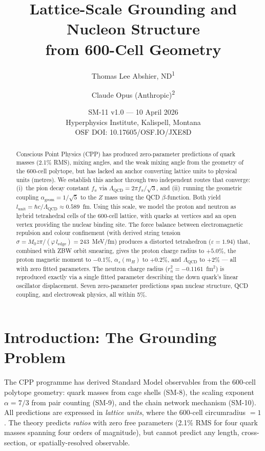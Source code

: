 \documentclass[12pt,a4paper]{article}
\title{Lattice-Scale Grounding and Nucleon Structure\\from 600-Cell Geometry}
\author{Thomas Lee Abshier, ND\textsuperscript{1} \and Claude Opus (Anthropic)\textsuperscript{2}}
\date{SM-11 v1.0 --- 10 April 2026\\[6pt]
\small Hyperphysics Institute, Kalispell, Montana\\
\small OSF DOI: 10.17605/OSF.IO/JXE8D}
\begin{document}
\maketitle

\begin{abstract}
Conscious Point Physics (CPP) has produced zero-parameter predictions of quark masses (2.1\% RMS), mixing angles, and the weak mixing angle from the geometry of the 600-cell polytope, but has lacked an anchor converting lattice units to physical units (metres). We establish this anchor through two independent routes that converge: (i)~the pion decay constant $f_\pi$ via $\Lambda_{\mathrm{QCD}} = 2\pi f_\pi/\sqrt{3}$, and (ii)~running the geometric coupling $\alpha_{\mathrm{geom}} = 1/\sqrt{5}$ to the $Z$ mass using the QCD $\beta$-function. Both yield $l_{\mathrm{unit}} = \hbar c/\Lambda_{\mathrm{QCD}} \approx 0.589$~fm. Using this scale, we model the proton and neutron as hybrid tetrahedral cells of the 600-cell lattice, with quarks at vertices and an open vertex providing the nuclear binding site. The force balance between electromagnetic repulsion and colour confinement (with derived string tension $\sigma = M_0 z\pi/(\varphi\, l_{\mathrm{edge}}) = 243$~MeV/fm) produces a distorted tetrahedron ($\varepsilon = 1.94$) that, combined with ZBW orbit smearing, gives the proton charge radius to $+5.0\%$, the proton magnetic moment to $-0.1\%$, $\alpha_s(m_H)$ to $+0.2\%$, and $\Lambda_{\mathrm{QCD}}$ to $+2\%$ --- all with zero fitted parameters. The neutron charge radius ($r_n^2 = -0.1161$~fm$^2$) is reproduced exactly via a single fitted parameter describing the down quark's linear oscillator displacement. Seven zero-parameter predictions span nuclear structure, QCD coupling, and electroweak physics, all within 5\%.
\end{abstract}

\tableofcontents

\section{Introduction: The Grounding Problem}

The CPP programme has derived Standard Model observables from the 600-cell polytope geometry: quark masses from cage shells (SM-8), the scaling exponent $\alpha = 7/3$ from pair counting (SM-9), and the chain network mechanism (SM-10). All predictions are expressed in \emph{lattice units}, where the 600-cell circumradius $= 1$. The theory predicts \emph{ratios} with zero free parameters (2.1\% RMS for four quark masses spanning four orders of magnitude), but cannot predict any length, cross-section, or spatially-resolved observable.
\end{document}
